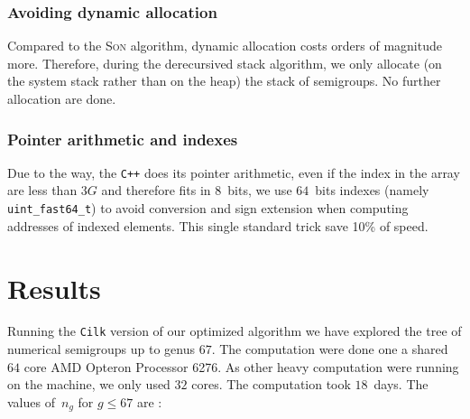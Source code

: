 \documentclass[reqno]{amsart}
\theoremstyle{plain}
\theoremstyle{definition}
\newcommand{\Cilk}{\texttt{Cilk}\xspace}
\newcommand{\CPP}{\texttt{C++}\xspace}
\renewcommand{\leq}{\leqslant}
\begin{document}
\vspace{1em}

\subsubsection*{Avoiding dynamic allocation} Compared to the \textsc{Son}
algorithm, dynamic allocation costs orders of magnitude more. Therefore, during
the derecursived stack algorithm, we only allocate (on the system stack rather
than on the heap) the stack of semigroups. No further allocation are done.

\subsubsection*{Pointer arithmetic and indexes}

Due to the way, the \CPP does its pointer arithmetic, even if the index in the
array are less than $3G$ and therefore fits in $8$~bits, we use $64$~bits
indexes (namely \verb|uint_fast64_t|) to avoid conversion and sign extension
when computing addresses of indexed elements. This single standard trick save
10\% of speed.


\section{Results}

Running the \Cilk version of our optimized algorithm we have explored the tree
of numerical semigroups up to genus $67$. The computation were done one a shared
$64$ core AMD Opteron\texttrademark{} Processor 6276. As other heavy
computation were running on the machine, we only used $32$ cores. The
computation took $18$~days. The values of~$n_g$ for $g\leq 67$ are :
\end{document}
